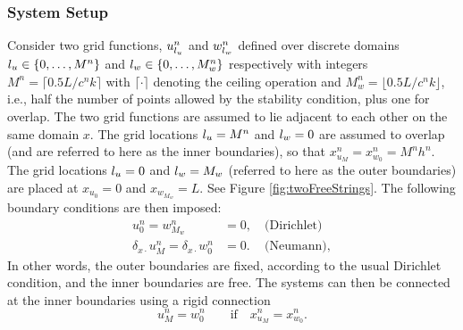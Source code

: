 \subsubsection{System Setup}\label{sec:systSetup}
Consider two grid functions, $u_{l_u}^n$ and $w_{l_w}^n$ defined over discrete domains ${l_u} \in \{0, \hdots, M^n\}$ and ${l_w} \in \{0, \hdots, M_w^n\}$ respectively with integers $M^n = \lceil 0.5L/c^nk\rceil $ with $\lceil \cdot \rceil$ denoting the ceiling operation and $M_w^n = \lfloor 0.5L/c^nk\rfloor$, i.e., half the number of points allowed by the stability condition, plus one for overlap. The two grid functions are assumed to lie adjacent to each other on the same domain $x$. The grid locations ${l_u} = M^n$ and ${l_w} = 0$ are assumed to overlap (and are referred to here as the inner boundaries), so that $x_{u_M}^n = x_{w_0}^n = M^nh^n$. The grid locations ${l_u} = 0$ and ${l_w} = M_w$ (referred to here as the outer boundaries) %
are placed at $x_{u_0} = 0$ and $x_{w_{M_w}} = L$. See Figure \ref{fig:twoFreeStrings}. The following boundary conditions are then imposed:
\begin{subequations}\label{eq:halfStringBoundaryCond}
    \begin{align}
        u_0^n = w_{M_w}^n &= 0,\quad \text{(Dirichlet)}\label{eq:halfStringBoundaryCondDirichlet}\\
        \delta_{x\cdot}u_M^n = \delta_{x\cdot}w_0^n &= 0.\, \quad\text{(Neumann)}, \label{eq:halfStringBoundaryCondNeumann}
    \end{align}
\end{subequations}
 In other words, the outer boundaries are fixed, according to the usual Dirichlet condition, and the inner boundaries are free.
%
%
The systems can then be connected at the inner boundaries using a rigid connection
\begin{equation}\label{eq:rigid}
    u_M^n = w_0^n \qquad \text{if}\quad x_{u_M}^n = x_{w_0}^n.
\end{equation}
